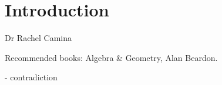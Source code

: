 
\def\npart {IA}
\def\nterm {Michaelmas}
\def\nyear {2021}
\def\nlecturer {Dr R.\ Camina}
\def\ncourse {Groups}



% 


\maketitle
\tableofcontents

\hypertarget{Introduction}{%
\section*{Introduction}\label{Introduction}}

Dr Rachel Camina

Recommended books: Algebra \& Geometry, Alan Beardon.

\begin{notation}
  \Lightning - contradiction
\end{notation} 

\newpage










